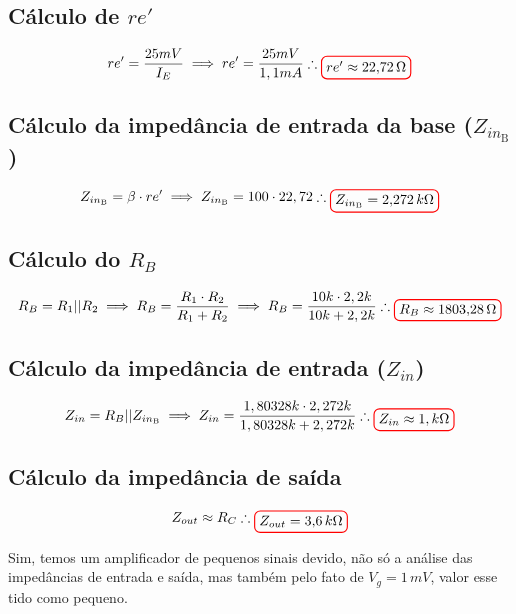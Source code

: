 \documentclass[12pt,openany,oneside,a4paper]{abntex2}
\begin{document}
\section{}

\subsection{Cálculo de $re'$}
\[
re' = \frac{25mV}{I_{E}} \implies re' = \frac{25mV}{1,1mA} \therefore \tikz[baseline]{\node[draw=red, thick, rounded corners] {$re' \approx 22{,}72\,\Omega$};}
\]

\subsection{Cálculo da impedância de entrada da base ($Z_{in_{\text{B}}}$)}
\[
Z_{in_{\text{B}}} = \beta \cdot re' \implies Z_{in_{\text{B}}} = 100 \cdot 22,72 \therefore \tikz[baseline]{\node[draw=red, thick, rounded corners] {$Z_{in_{\text{B}}} = 2{,}272\,k\Omega$};}
\]

\subsection{Cálculo do $R_{B}$}
\[
R_{B} = R_{1} || R_{2} \implies R_{B} = \frac{R_{1} \cdot R_{2}}{R_{1} + R_{2}} \implies R_{B} = \frac{10k \cdot 2,2k}{10k + 2,2k} \therefore \tikz[baseline]{\node[draw=red, thick, rounded corners] {$R_{B} \approx 1803{,}28\,\Omega$};}
\]

\subsection{Cálculo da impedância de entrada ($Z_{in}$)}
\[
Z_{in} = R_{B} || Z_{in_{\text{B}}} \implies Z_{in} = \frac{1,80328k \cdot 2,272k}{1,80328k + 2,272k} \therefore \tikz[baseline]{\node[draw=red, thick, rounded corners] {$Z_{in} \approx 1{,}\,k\Omega$};}
\]

\subsection{Cálculo da impedância de saída}
\[
Z_{out} \approx R_{C} \therefore \tikz[baseline]{\node[draw=red, thick, rounded corners] {$Z_{out} = 3{,}6\,k\Omega$};}
\]

Sim, temos um amplificador de pequenos sinais devido, não só a análise das impedâncias de entrada e saída, mas também pelo fato de $V_{g} = 1\,mV$, valor esse tido como pequeno.
\end{document}
